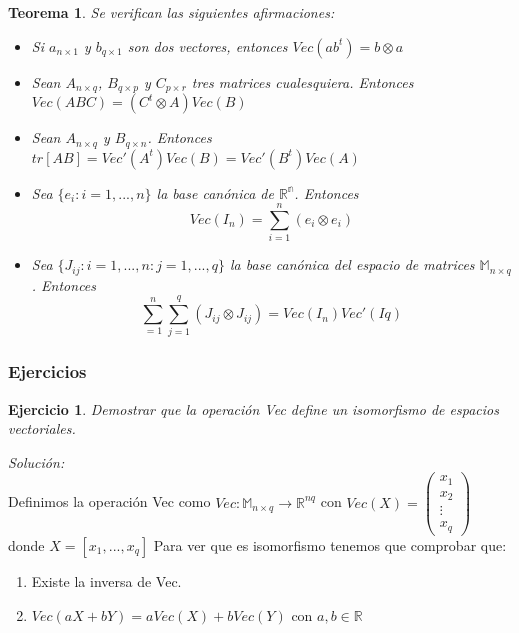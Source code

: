 \documentclass{article}
\theoremstyle{theorem-style}  %
\newtheorem{theorem}{Teorema}[section]  %
\theoremstyle{definition-style}
\theoremstyle{example-style}
\theoremstyle{exercise-style}
\newtheorem{exercise}{Ejercicio}[section]
\begin{document}
	\begin{theorem}\label{PropKroVec}
		\textit{Se verifican las siguientes afirmaciones:}
		
		\begin{itemize}
			\item \textit{Si $a_{n \times 1}$ y $b_{q \times 1}$ son dos vectores, entonces $Vec(a b^t )=b \otimes a$}
			
			\item \textit{Sean $A_{n \times q}$, $B_{q \times p}$ y $C_{p \times r }$ tres matrices cualesquiera. Entonces $Vec(ABC) = (C^t \otimes A)Vec(B)$}
			
			\item \textit{Sean $A_{n \times q}$ y $B_{q \times n}$. Entonces $tr[AB] = Vec'(A^t)Vec(B) = Vec'(B^t)Vec(A)$}
			
			\item \textit{Sea $\{e_i: i = 1, ..., n\}$ la base canónica de  $\mathbb{R^n}$. Entonces $$Vec(I_n) = \sum_{i=1}^{n}(e_i \otimes e_i)$$}
			
			\item \textit{Sea $\{J_{ij}: i = 1, ..., n: j = 1, ..., q\}$ la base canónica del espacio de matrices $\mathbb{M}_{n \times q}$. Entonces $$\sum_{=1}^{n}  \sum_{j=1}^{q} (J_{ij} \otimes J_{ij}) = Vec(I_n) Vec'(Iq)$$ }
			
		\end{itemize}
	\end{theorem}
	
	\subsubsection{Ejercicios}
	
	\begin{exercise}
		Demostrar que la operación Vec define un isomorfismo de espacios vectoriales.
	\end{exercise}
	\textit{Solución:}
	\\Definimos la operación Vec como $Vec: \mathbb{M}_{n\times q} \rightarrow \mathbb{R}^{nq}$ con $ Vec(X) = \left({\begin{array}{c}
		x_1\\
		x_2\\
		\vdots \\
		x_q
		\end{array} } \right)$ donde $X=[x_1,...,x_q]$
	Para ver que es isomorfismo tenemos que comprobar que:
	\begin{enumerate}
		\item Existe la inversa de Vec.
		\item $Vec(aX+bY)=aVec(X)+bVec(Y)$ con $a,b \in \mathbb{R}$
	\end{enumerate}
	
\end{document}
